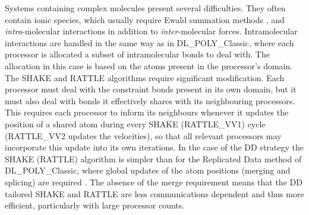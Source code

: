 Systems containing complex molecules present several difficulties.
They often contain ionic species, which usually require Ewald
summation methods \cite{allen-89a,smith-92b},
and {\em intra}-molecular interactions in addition to
{\em inter}-molecular forces.  Intramolecular interactions are
handled in the same way as in DL\_POLY\_Classic, where each processor
is allocated a subset of intramolecular bonds to deal with.  The
allocation in this case is based on the atoms present in the
processor's domain.  The SHAKE and
RATTLE algorithms \cite{ryckaert-77a,andersen-83a}
require significant modification.  Each processor must deal with
the constraint bonds present in its own domain, but it must also
deal with bonds it effectively shares with its neighbouring
processors.  This requires each processor to inform its neighbours
whenever it updates the position of a shared atom during every
SHAKE (RATTLE\_VV1) cycle (RATTLE\_VV2 updates the velocities),
so that all relevant processors may incorporate this update into
its own iterations.  In the case of the DD strategy the SHAKE
(RATTLE) algorithm is simpler than for the Replicated Data method
of DL\_POLY\_Classic, where global updates of the atom positions
(merging and splicing) are required \cite{smith-93b}.  The
absence of the merge requirement means that the DD tailored
SHAKE and RATTLE are less communications dependent and thus more
efficient, particularly with large processor counts.

